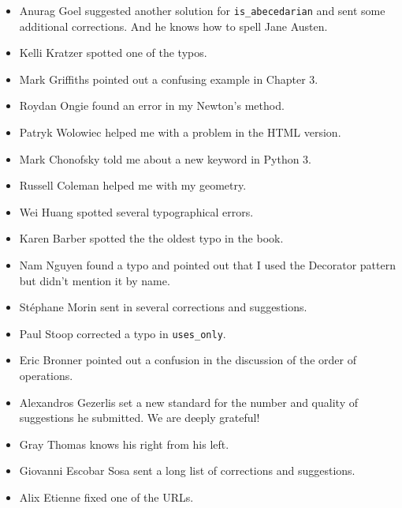 \documentclass[10pt]{book}
\begin{document}
\begin{itemize}
\item Anurag Goel suggested another solution for \verb"is_abecedarian"
and sent some additional corrections.  And he knows how to
spell Jane Austen.

\item Kelli Kratzer spotted one of the typos.

\item Mark Griffiths pointed out a confusing example in Chapter 3.

\item Roydan Ongie found an error in my Newton's method.

\item Patryk Wolowiec helped me with a problem in the HTML version.

\item Mark Chonofsky told me about a new keyword in Python 3.

\item Russell Coleman helped me with my geometry.

\item Wei Huang spotted several typographical errors.

\item Karen Barber spotted the the oldest typo in the book.

\item Nam Nguyen found a typo and pointed out that I used the Decorator
pattern but didn't mention it by name.

\item St\'{e}phane Morin sent in several corrections and suggestions.

\item Paul Stoop corrected a typo in \verb+uses_only+.

\item Eric Bronner pointed out a confusion in the discussion of the
order of operations.

\item Alexandros Gezerlis set a new standard for the number and
quality of suggestions he submitted.  We are deeply grateful!

\item Gray Thomas knows his right from his left.

\item Giovanni Escobar Sosa sent a long list of corrections and
suggestions.

\item Alix Etienne fixed one of the URLs.


\end{itemize}
\end{document}
